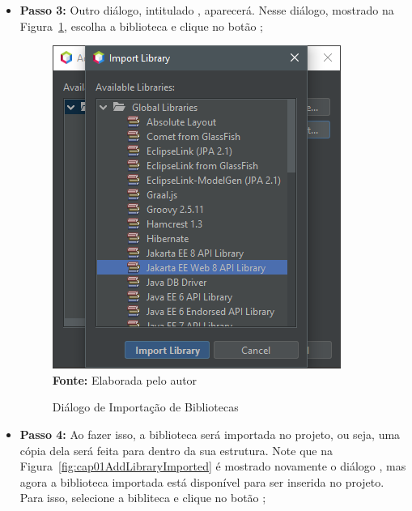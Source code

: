 \begin{itemize}
    \item \textbf{Passo 3:} Outro diálogo, intitulado , aparecerá. Nesse diálogo, mostrado na Figura~\ref{fig:cap01AddLibraryImport}, escolha a biblioteca  e clique no botão ;
    
    \FloatBarrier
    \begin{figure}[!htbp]
        \centering
        \caption{Diálogo de Importação de Bibliotecas}
        \includegraphics[scale=0.9]{imagens/cap01AddLibraryImport}
        \\\textbf{Fonte:} Elaborada pelo autor
        \label{fig:cap01AddLibraryImport}
    \end{figure}
    \FloatBarrier
    
    \item \textbf{Passo 4:} Ao fazer isso, a biblioteca será importada no projeto, ou seja, uma cópia dela será feita para dentro da sua estrutura. Note que na Figura~\ref{fig:cap01AddLibraryImported} é mostrado novamente o diálogo , mas agora a biblioteca importada está disponível para ser inserida no projeto. Para isso, selecione a bibliteca e clique no botão ;
    

\end{itemize}

